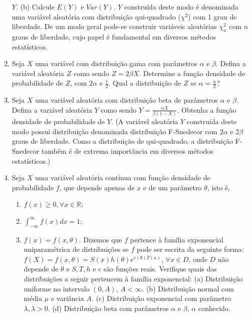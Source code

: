 \documentclass[
  10pt,
]{article}
\providecommand{\tightlist}{%
  \setlength{\itemsep}{0pt}\setlength{\parskip}{0pt}}
\begin{document}
\begin{enumerate}
  \(Y\). (b) Calcule \(E(Y)\) e \(Var(Y)\). \(Y\) construída deste modo
  é denominada uma variável aleatória com distribuição qui-quadrado
  (\(\chi^2\)) com 1 grau de liberdade. De um modo geral pode-se
  construir variáveis aleatórias \(\chi_n^2\) com \(n\) graus de
  liberdade, cujo papel é fundamental em diversos métodos estatísticos.
\item
  Seja \(X\) uma variável com distribuição gama com parâmetros
  \(\alpha\) e \(\beta\). Defina a variável aleatória \(Z\) como sendo
  \(Z = 2\beta X\). Determine a função densidade de probabilidade de
  \(Z\), com \(2\alpha\) e \(\frac{1}{2}\). Qual a distribuição de \(Z\)
  se \(\alpha = \frac{n}{2}\)?
\item
  Seja \(X\) uma variável aleatória com distribuição beta de parâmetros
  \(\alpha\) e \(\beta\). Defina a variável aleatória \(Y\) como sendo
  \(Y = \frac{\alpha X}{\beta(1 - X)}\). Obtenha a função densidade de
  probabilidade de \(Y\). (A variável aleatória \(Y\) construída deste
  modo possui distribuição denominada distribuição F-Snedecor com
  \(2\alpha\) e \(2\beta\) graus de liberdade. Como a distribuição de
  qui-quadrado, a distribuição F-Snedecor também é de extrema
  importância em diversos métodos estatísticos.)
\item
  Seja \(X\) uma variável aleatória contínua com função densidade de
  probabilidade \(f\), que depende apenas de \(x\) e de um parâmetro
  \(\theta\), isto é,

  \begin{enumerate}
  \def\labelenumii{\arabic{enumii})}
  \tightlist
  \item
    \(f(x) \geq 0, \forall x \in \mathbb{R}\);
  \item
    \(\int_{-\infty}^{\infty} f(x)dx = 1\);
  \item
    \(f(x) = f(x, \theta)\). Dizemos que \(f\) pertence à família
    exponencial uniparamétrica de distribuições se \(f\) pode ser
    escrita da seguinte forma:
    \(f(X) = f(x, \theta) = S(x)h(\theta)e^{c(\theta)T(x)}\),
    \(\forall x \in D\), onde \(D\) não depende de \(\theta\) e
    \(S, T, h\) e \(c\) são funções reais. Verifique quais das
    distribuições a seguir pertencem à família exponencial: (a)
    Distribuição uniforme no intervalo \((0, A)\), \(A < \infty\). (b)
    Distribuição normal com média \(\mu\) e variância \(A\). (c)
    Distribuição exponencial com parâmetro \(\lambda, \lambda > 0\). (d)
    Distribuição beta com parâmetros \(\alpha\) e \(\beta\), \(\alpha\)
    conhecido.
  \end{enumerate}
\end{enumerate}
\end{document}
